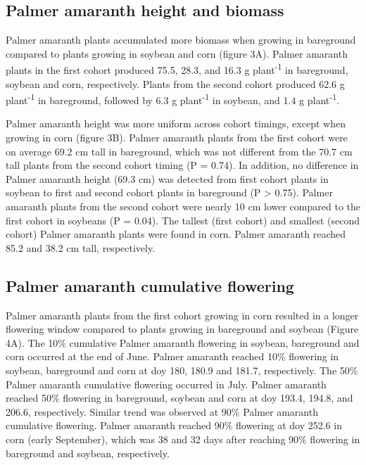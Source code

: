 \documentclass[utf8]{frontiersSCNS}
\begin{document}
\hypertarget{palmer-amaranth-height-and-biomass}{%
\subsection*{Palmer amaranth height and
biomass}\label{palmer-amaranth-height-and-biomass}}

Palmer amaranth plants accumulated more biomass when growing in
bareground compared to plants growing in soybean and corn (figure 3A).
Palmer amaranth plants in the first cohort produced 75.5, 28.3, and 16.3
g plant\textsuperscript{-1} in bareground, soybean and corn,
respectively. Plants from the second cohort produced 62.6 g
plant\textsuperscript{-1} in bareground, followed by 6.3 g
plant\textsuperscript{-1} in soybean, and 1.4 g
plant\textsuperscript{-1}.

Palmer amaranth height was more uniform across cohort timings, except
when growing in corn (figure 3B). Palmer amaranth plants from the first
cohort were on average 69.2 cm tall in bareground, which was not
different from the 70.7 cm tall plants from the second cohort timing (P
= 0.74). In addition, no difference in Palmer amaranth height (69.3 cm)
was detected from first cohort plants in soybean to first and second
cohort plants in bareground (P \textgreater{} 0.75). Palmer amaranth
plants from the second cohort were nearly 10 cm lower compared to the
first cohort in soybeans (P = 0.04). The tallest (first cohort) and
smallest (second cohort) Palmer amaranth plants were found in corn.
Palmer amaranth reached 85.2 and 38.2 cm tall, respectively.

\hypertarget{palmer-amaranth-cumulative-flowering}{%
\subsection*{Palmer amaranth cumulative
flowering}\label{palmer-amaranth-cumulative-flowering}}

Palmer amaranth plants from the first cohort growing in corn resulted in
a longer flowering window compared to plants growing in bareground and
soybean (Figure 4A). The 10\% cumulative Palmer amaranth flowering in
soybean, bareground and corn occurred at the end of June. Palmer
amaranth reached 10\% flowering in soybean, bareground and corn at doy
180, 180.9 and 181.7, respectively. The 50\% Palmer amaranth cumulative
flowering occurred in July. Palmer amaranth reached 50\% flowering in
bareground, soybean and corn at doy 193.4, 194.8, and 206.6,
respectively. Similar trend was observed at 90\% Palmer amaranth
cumulative flowering. Palmer amaranth reached 90\% flowering at doy
252.6 in corn (early September), which was 38 and 32 days after reaching
90\% flowering in bareground and soybean, respectively.
\end{document}
